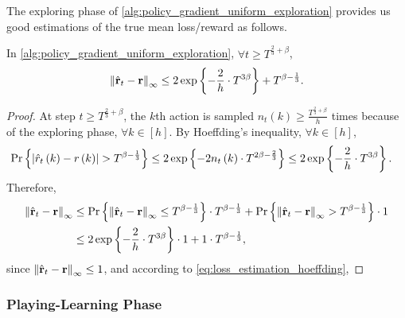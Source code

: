 The exploring phase of \cref{alg:policy_gradient_uniform_exploration} provides us good estimations of the true mean loss/reward as follows.
\begin{thm}
\label{thm:reward_estimation_hoeffding}
    In \cref{alg:policy_gradient_uniform_exploration}, $\forall t \ge T^{\frac{2}{3} + \beta}$,
\begin{equation*}
    \left\| \hat{{\mathbf{r}}}_t - {\mathbf{r}} \right\|_\infty \le 2 \exp\left\{ - \frac{2}{h} \cdot  T^{3\beta} \right\} + T^{\beta - \frac{1}{3}}.
\end{equation*}
\end{thm}
\begin{proof}
    At step $t \ge T^{\frac{2}{3} + \beta}$, the $k$th action is sampled $n_{t}\left(k\right) \ge \frac{T^{\frac{2}{3} + \beta} }{h}$ times because of the exploring phase, $\forall k \in [h]$. By Hoeffding's inequality, $\forall k \in [h]$,
\begin{equation}
\label{eq:loss_estimation_hoeffding}
\begin{split}
    {\text{Pr}}\left\{ \left| \hat{r}_{t}\left(k\right) - r\left(k\right) \right| > T^{\beta - \frac{1}{3}} \right\} &\le 2 \exp\left\{ - 2 n_{t}\left(k\right) \cdot T^{2\beta - \frac{2}{3}} \right\} \le 2 \exp\left\{ - \frac{2}{h} \cdot  T^{3\beta} \right\}.
\end{split}
\end{equation}
Therefore,
\begin{equation*}
\begin{split}
    \left\| \hat{{\mathbf{r}}}_t - {\mathbf{r}} \right\|_\infty &\le {\text{Pr}}\left\{ \left\| \hat{{\mathbf{r}}}_t - {\mathbf{r}} \right\|_\infty \le T^{\beta - \frac{1}{3}} \right\} \cdot T^{\beta - \frac{1}{3}} + {\text{Pr}}\left\{ \left\| \hat{{\mathbf{r}}}_t - {\mathbf{r}} \right\|_\infty > T^{\beta - \frac{1}{3}} \right\} \cdot 1 \\
    &\le 2 \exp\left\{ - \frac{2}{h} \cdot  T^{3\beta} \right\} \cdot 1 + 1 \cdot T^{\beta - \frac{1}{3}},
\end{split}
\end{equation*}
since $\left\| \hat{{\mathbf{r}}}_t - {\mathbf{r}} \right\|_\infty \le 1$, and according to \cref{eq:loss_estimation_hoeffding}, 
\end{proof}

\subsubsection{Playing-Learning Phase}
\label{subsubsec:playing_learning_phase}

